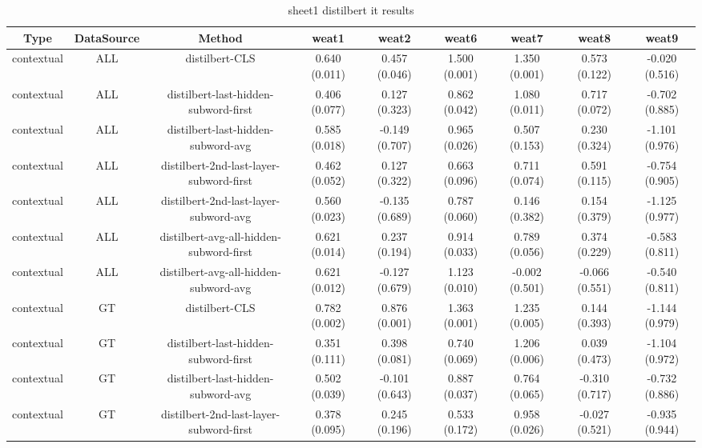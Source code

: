 \begin{sidewaystable}[htb]
    \centering
    \caption{sheet1 distilbert it results}
    \label{appendix_tab:sheet1_distilbert_it_results}
    \small
    \begin{tabular}{@{}ccccccccc@{}}
        \toprule
        Type & DataSource & Method & weat1 & weat2 & weat6 & weat7 & weat8 & weat9 \\
        \midrule
        contextual & ALL & distilbert-CLS & 0.640 (0.011) & 0.457 (0.046) & 1.500 (0.001) & 1.350 (0.001) & 0.573 (0.122) & -0.020 (0.516) \\
        contextual & ALL & distilbert-last-hidden-subword-first & 0.406 (0.077) & 0.127 (0.323) & 0.862 (0.042) & 1.080 (0.011) & 0.717 (0.072) & -0.702 (0.885) \\
        contextual & ALL & distilbert-last-hidden-subword-avg & 0.585 (0.018) & -0.149 (0.707) & 0.965 (0.026) & 0.507 (0.153) & 0.230 (0.324) & -1.101 (0.976) \\
        contextual & ALL & distilbert-2nd-last-layer-subword-first & 0.462 (0.052) & 0.127 (0.322) & 0.663 (0.096) & 0.711 (0.074) & 0.591 (0.115) & -0.754 (0.905) \\
        contextual & ALL & distilbert-2nd-last-layer-subword-avg & 0.560 (0.023) & -0.135 (0.689) & 0.787 (0.060) & 0.146 (0.382) & 0.154 (0.379) & -1.125 (0.977) \\
        contextual & ALL & distilbert-avg-all-hidden-subword-first & 0.621 (0.014) & 0.237 (0.194) & 0.914 (0.033) & 0.789 (0.056) & 0.374 (0.229) & -0.583 (0.811) \\
        contextual & ALL & distilbert-avg-all-hidden-subword-avg & 0.621 (0.012) & -0.127 (0.679) & 1.123 (0.010) & -0.002 (0.501) & -0.066 (0.551) & -0.540 (0.811) \\
        contextual & GT & distilbert-CLS & 0.782 (0.002) & 0.876 (0.001) & 1.363 (0.001) & 1.235 (0.005) & 0.144 (0.393) & -1.144 (0.979) \\
        contextual & GT & distilbert-last-hidden-subword-first & 0.351 (0.111) & 0.398 (0.081) & 0.740 (0.069) & 1.206 (0.006) & 0.039 (0.473) & -1.104 (0.972) \\
        contextual & GT & distilbert-last-hidden-subword-avg & 0.502 (0.039) & -0.101 (0.643) & 0.887 (0.037) & 0.764 (0.065) & -0.310 (0.717) & -0.732 (0.886) \\
        contextual & GT & distilbert-2nd-last-layer-subword-first & 0.378 (0.095) & 0.245 (0.196) & 0.533 (0.172) & 0.958 (0.026) & -0.027 (0.521) & -0.935 (0.944) \\

\end{tabular}
\end{sidewaystable}
